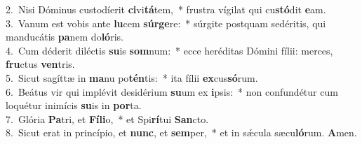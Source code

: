 {2.~}Nisi Dóminus custodíerit \textbf{ci}vi\textbf{tá}tem,~* frustra vígilat qui cu\textbf{stó}dit \textbf{e}am.\\
{3.~}Vanum est vobis ante \textbf{lu}cem \textbf{súr}\textbf{ge}re:~* súrgite postquam sedéritis, qui manducátis \textbf{pa}nem do\textbf{ló}ris.\\
{4.~}Cum déderit diléctis \textbf{su}is \textbf{som}num:~* ecce heréditas Dómini fílii: merces, \textbf{fru}ctus \textbf{ven}tris.\\
{5.~}Sicut sagíttæ in \textbf{ma}nu po\textbf{tén}tis:~* ita fílii \textbf{ex}cus\textbf{só}rum.\\
{6.~}Beátus vir qui implévit desidérium \textbf{su}um ex \textbf{i}psis:~* non confundétur cum loquétur inimícis \textbf{su}is in \textbf{por}ta.\\
{7.~}Glória \textbf{Pa}tri, et \textbf{Fí}\textbf{li}o,~* et Spi\textbf{rí}tui \textbf{San}cto.\\
{8.~}Sicut erat in princípio, et \textbf{nunc}, et \textbf{sem}per,~* et in sǽcula sæcu\textbf{ló}rum. \textbf{A}men.\\
